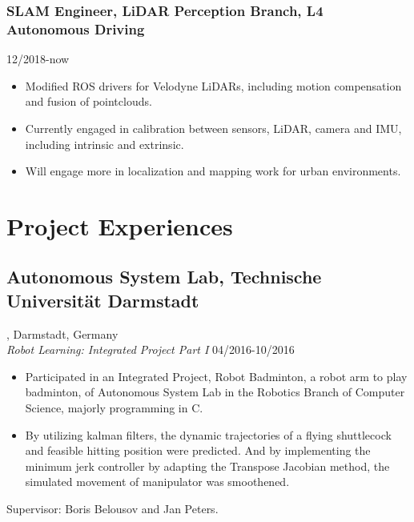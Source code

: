 \documentclass{article}
\begin{document}
\subsubsection{SLAM Engineer, LiDAR Perception Branch, L4 Autonomous Driving} \hfill 12/2018-now
\begin{itemize}[noitemsep,topsep=1pt]
\item Modified ROS drivers for Velodyne LiDARs, including motion compensation and fusion of pointclouds. 
\item Currently engaged in calibration between sensors, LiDAR, camera and IMU, including intrinsic and extrinsic.  
\item Will engage more in localization and mapping work for urban environments.  
\end{itemize}


\section{Project Experiences}
\subsection{Autonomous System Lab, Technische Universit\"at Darmstadt}, Darmstadt, Germany\\
\emph{Robot Learning: Integrated Project Part I }\hfill 04/2016-10/2016
\begin{itemize}[noitemsep,topsep=1pt]
\item Participated in an Integrated Project, Robot Badminton, a robot arm to play badminton, of Autonomous System Lab in the Robotics Branch of Computer Science, majorly programming in  C.
\item By utilizing kalman filters, the dynamic trajectories of a flying shuttlecock and feasible hitting position were predicted. And by implementing the minimum jerk controller by adapting the Transpose Jacobian method, the simulated movement of manipulator was smoothened.
\end{itemize}
Supervisor: Boris Belousov and Jan Peters.
\end{document}
